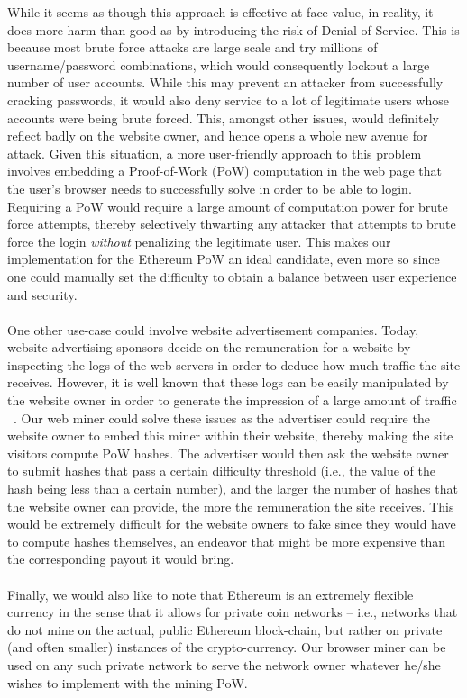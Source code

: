 \documentclass[runningheads]{llncs}
\begin{document}
While it seems as though this approach is effective at face value, in reality, it does more harm than good as by introducing the risk of Denial of Service. This is because most brute force attacks are large scale and try millions of username/password combinations, which would consequently lockout a large number of user accounts. While this may prevent an attacker from successfully cracking passwords, it would also deny service to a lot of legitimate users whose accounts were being brute forced. This, amongst other issues, would definitely reflect badly on the website owner, and hence opens a whole new avenue for attack.   
Given this situation, a more user-friendly approach to this problem involves embedding a Proof-of-Work (PoW) computation in the web page that the user's browser needs to successfully solve in order to be able to login. Requiring a PoW would require a large amount of computation power for brute force attempts, thereby selectively thwarting any attacker that attempts to brute force the login \emph{without} penalizing the legitimate user. This makes our implementation for the Ethereum PoW an ideal candidate, even more so since one could manually set the difficulty to obtain a balance between user experience and security. \\ \\
One other use-case could involve website advertisement companies. Today, website advertising sponsors decide on the remuneration for a website by inspecting the logs of the web servers in order to deduce how much traffic the site receives. However, it is well known that these logs can be easily manipulated by the website owner in order to generate the impression of a large amount of traffic ~\cite{webLogsManipulation}. Our web miner could solve these issues as the advertiser could require the website owner to embed this miner within their website, thereby making the site visitors compute PoW hashes. The advertiser would then ask the website owner to submit hashes that pass a certain difficulty threshold (i.e., the value of the hash being less than a certain number), and the larger the number of hashes that the website owner can provide, the more the remuneration the site receives. This would be extremely difficult for the website owners to fake since they would have to compute hashes themselves, an endeavor that might be more expensive than the corresponding payout it would bring.\\ \\
Finally, we would also like to note that Ethereum is an extremely flexible currency in the sense that it allows for private coin networks -- i.e., networks that do not mine on the actual, public Ethereum block-chain, but rather on private (and often smaller) instances of the crypto-currency. Our browser miner can be used on any such private network to serve the network owner whatever he/she wishes to implement with the mining PoW.
\end{document}
